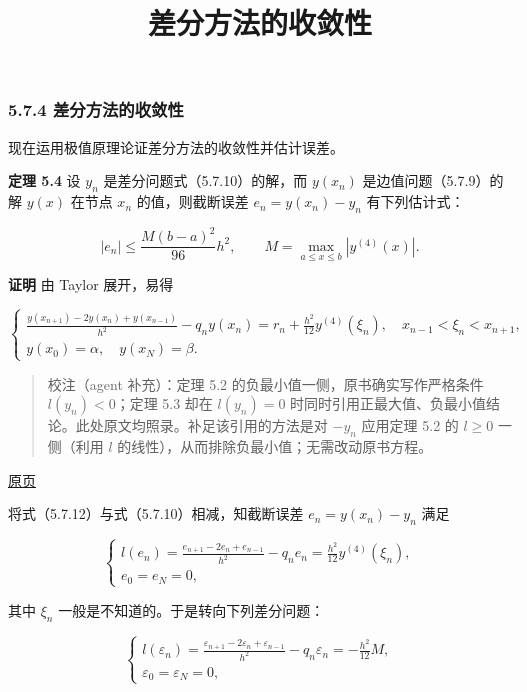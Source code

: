 \documentclass[
  10pt,
  fontset=fandol]{ctexart}
\title{差分方法的收敛性}
\author{}
\date{}
\begin{document}
\maketitle

\subsubsection{5.7.4 差分方法的收敛性}\label{ux5deeux5206ux65b9ux6cd5ux7684ux6536ux655bux6027}

现在运用极值原理论证差分方法的收敛性并估计误差。

\textbf{定理 5.4} 设 \(y_n\) 是差分问题式（5.7.10）的解，而 \(y(x_n)\) 是边值问题（5.7.9）的解 \(y(x)\) 在节点 \(x_n\) 的值，则截断误差 \(e_n=y(x_n)-y_n\) 有下列估计式：

\[
|e_n|\le\frac{M(b-a)^2}{96}h^2,\qquad
M=\max_{a\le x\le b}|y^{(4)}(x)|.
\tag{5.7.11}
\]

\textbf{证明} 由 Taylor 展开，易得

\[
\begin{cases}
\displaystyle\frac{y(x_{n+1})-2y(x_n)+y(x_{n-1})}{h^2}-q_ny(x_n)=r_n+\frac{h^2}{12}y^{(4)}(\xi_n),\quad x_{n-1}<\xi_n<x_{n+1},\\[6pt]
y(x_0)=\alpha,\quad y(x_N)=\beta.
\end{cases}
\tag{5.7.12}
\]

\begin{quote}
校注（agent 补充）：定理 5.2 的负最小值一侧，原书确实写作严格条件 \(l(y_n)<0\)；定理 5.3 却在 \(l(y_n)=0\) 时同时引用正最大值、负最小值结论。此处原文均照录。补足该引用的方法是对 \(-y_n\) 应用定理 5.2 的 \(l\ge0\) 一侧（利用 \(l\) 的线性），从而排除负最小值；无需改动原书方程。
\end{quote}

\href{../../source-images/pdf-152.jpeg}{原页}

将式（5.7.12）与式（5.7.10）相减，知截断误差 \(e_n=y(x_n)-y_n\) 满足

\[
\begin{cases}
\displaystyle l(e_n)=\frac{e_{n+1}-2e_n+e_{n-1}}{h^2}-q_ne_n=\frac{h^2}{12}y^{(4)}(\xi_n),\\[6pt]
e_0=e_N=0,
\end{cases}
\]

其中 \(\xi_n\) 一般是不知道的。于是转向下列差分问题：

\[
\begin{cases}
\displaystyle l(\varepsilon_n)=\frac{\varepsilon_{n+1}-2\varepsilon_n+\varepsilon_{n-1}}{h^2}-q_n\varepsilon_n=-\frac{h^2}{12}M,\\[6pt]
\varepsilon_0=\varepsilon_N=0,
\end{cases}
\tag{5.7.13}
\]
\end{document}
